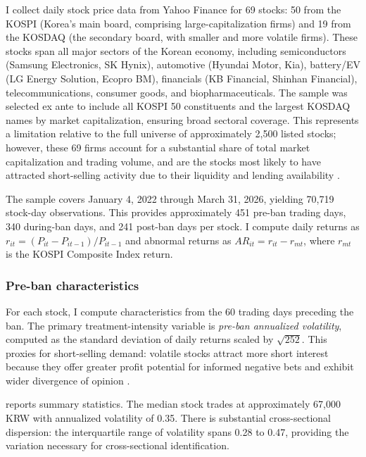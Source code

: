 \documentclass[12pt]{article}
\begin{document}
I collect daily stock price data from Yahoo Finance for 69 stocks: 50 from the KOSPI (Korea's main board, comprising large-capitalization firms) and 19 from the KOSDAQ (the secondary board, with smaller and more volatile firms). These stocks span all major sectors of the Korean economy, including semiconductors (Samsung Electronics, SK Hynix), automotive (Hyundai Motor, Kia), battery/EV (LG Energy Solution, Ecopro BM), financials (KB Financial, Shinhan Financial), telecommunications, consumer goods, and biopharmaceuticals. The sample was selected ex ante to include all KOSPI 50 constituents and the largest KOSDAQ names by market capitalization, ensuring broad sectoral coverage. This represents a limitation relative to the full universe of approximately 2,500 listed stocks; however, these 69 firms account for a substantial share of total market capitalization and trading volume, and are the stocks most likely to have attracted short-selling activity due to their liquidity and lending availability \citep{nagel2005short}.

The sample covers January 4, 2022 through March 31, 2026, yielding 70,719 stock-day observations. This provides approximately 451 pre-ban trading days, 340 during-ban days, and 241 post-ban days per stock. I compute daily returns as $r_{it} = (P_{it} - P_{it-1}) / P_{it-1}$ and abnormal returns as $AR_{it} = r_{it} - r_{mt}$, where $r_{mt}$ is the KOSPI Composite Index return.

\subsubsection*{Pre-ban characteristics} For each stock, I compute characteristics from the 60 trading days preceding the ban. The primary treatment-intensity variable is \textit{pre-ban annualized volatility}, computed as the standard deviation of daily returns scaled by $\sqrt{252}$. This proxies for short-selling demand: volatile stocks attract more short interest because they offer greater profit potential for informed negative bets and exhibit wider divergence of opinion \citep{hong2003differences}.



 reports summary statistics. The median stock trades at approximately 67,000 KRW with annualized volatility of 0.35. There is substantial cross-sectional dispersion: the interquartile range of volatility spans 0.28 to 0.47, providing the variation necessary for cross-sectional identification.
\end{document}
